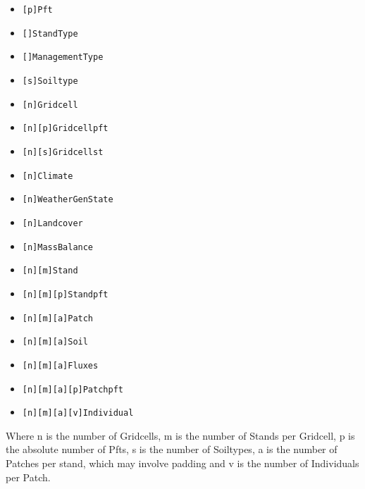 \begin{itemize}
  \item \texttt{[p]Pft}
  \item \texttt{[]StandType}
  \item \texttt{[]ManagementType}
  \item \texttt{[s]Soiltype}

  \item \texttt{[n]Gridcell}
  \item \texttt{[n][p]Gridcellpft}
  \item \texttt{[n][s]Gridcellst}
  \item \texttt{[n]Climate}
  \item \texttt{[n]WeatherGenState}
  \item \texttt{[n]Landcover}
  \item \texttt{[n]MassBalance}

  \item \texttt{[n][m]Stand}
  \item \texttt{[n][m][p]Standpft}

  \item \texttt{[n][m][a]Patch}
  \item \texttt{[n][m][a]Soil}
  \item \texttt{[n][m][a]Fluxes}
  \item \texttt{[n][m][a][p]Patchpft}
  \item \texttt{[n][m][a][v]Individual}
\end{itemize}

Where n is the number of Gridcells, m is the number of Stands per Gridcell, p is the absolute number of Pfts, s is the number of Soiltypes, a is the number of Patches per stand, which may involve padding and v is the number of Individuals per Patch.

